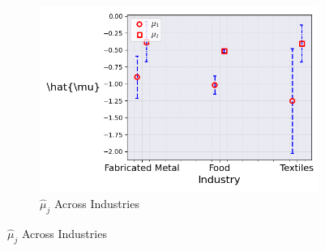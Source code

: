 \documentclass{article}
\begin{document}
\begin{figure}[ht!]
\begin{subfigure}[t]{0.32\textwidth}
        \centering
        \includegraphics[width=\textwidth]{figure/stationary_mixture_kmshare_ciiu_mubar_across_industries_m2.png}
        \caption{$\hat{\mu}_j$ Across Industries}
    \end{subfigure}


\end{figure}
\end{document}
